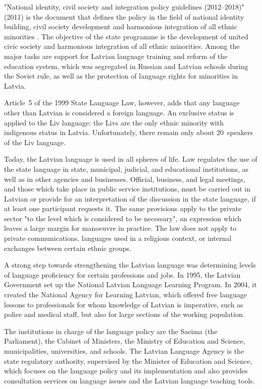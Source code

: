 \begin{multicols}{2}
"National identity, civil society and integration policy guidelines (2012--2018)" (2011) is the document that defines the policy in the field of national identity building, civil society development  and harmonious integration of all ethnic minorities \cite{Meta3}.
The objective of the state programme is the development of united civic society and harmonious integration of all ethnic minorities. 
Among the major tasks are support for Latvian language training and reform of the education system, which was segregated in Russian and Latvian schools during the Soviet rule, as well as the protection of language rights for minorities in Latvia.

Article~5 of the 1999 State Language Law, however, adds that any language other than Latvian is considered a foreign language.
An exclusive status is applied to the Liv language: the Livs are the only ethnic minority with indigenous status in Latvia.
Unfortunately, there remain only about 20~speakers of the Liv language.

Today, the Latvian language is used in all spheres of life.
Law regulates the use of the state language in state, municipal, judicial, and educational institutions, as well as in other agencies and businesses.
Official, business, and legal meetings, and those which take place in public service institutions, must be carried out in Latvian or provide for an interpretation of the discussion in the state language, if at least one participant requests it.
The same provisions apply to the private sector "to the level which is considered to be necessary", an expression which leaves a large margin for manoeuvre in practice.
The law does not apply to private communications, languages used in a religious context, or internal exchanges between certain ethnic groups.

A strong step towards strengthening the Latvian language was determining levels of language proficiency for certain professions and jobs.
In 1995, the Latvian Government set up the National Latvian Language Learning Program.
In 2004, it created the National Agency for Learning Latvian, which offered free language lessons to professionals for whom knowledge of Latvian is imperative, such as police and medical staff, but also for large sections of the working population.

The institutions in charge of the language policy are the Saeima (the Parliament), the Cabinet of Ministers, the Ministry of Education and Science, municipalities, universities, and schools.
The Latvian Language Agency is the state regulatory authority, supervised by the Minister of Education and Science, which focuses on the language policy and its implementation and also provides consultation services on language issues and the Latvian language teaching tools.


\end{multicols}
